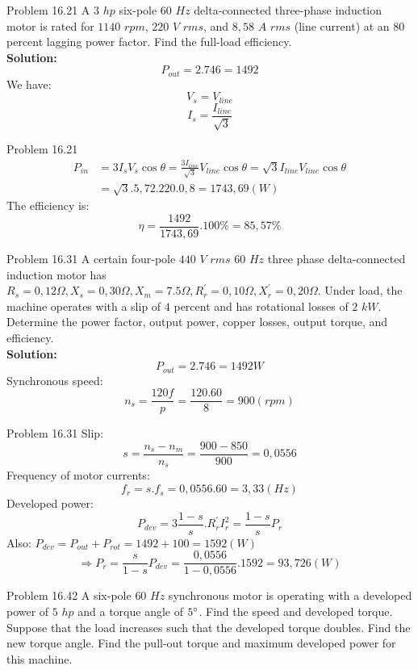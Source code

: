 \documentclass[11pt,aspectratio=169]{beamer}
\begin{document}
\begin{frame}{Problem 16.21}
    A $3$ $hp$ six-pole $60$ $Hz$ delta-connected 
    three-phase induction motor is rated for 
    $1140$ $rpm$, $220$ $V$ $rms$, and $8,58$ $A$ $rms$ (line 
    current) at an $80$ percent lagging power factor. Find the full-load efficiency.
    \\
    \textbf{Solution:}
    \\$$P_{out}=2.746=1492$$
    We have:
    $$V_{s}=V_{line}$$
    $$I_{s}=\frac{I_{line}}{\sqrt{3}}$$
\end{frame}
\begin{frame}{Problem 16.21}
    \begin{align*}
        P_{in}&=3I_{s}V_{s}\cos{\theta}=\frac{3I_{line}}{\sqrt{3}}V_{line}\cos{\theta}=\sqrt{3}I_{line}V_{line}\cos{\theta}\\&=\sqrt{3}.5,72.220.0,8=1743,69 (W)
        \end{align*}
        The efficiency is:
        $$\eta=\frac{1492}{1743,69}.100\%=85,57\%$$
\end{frame}
\begin{frame}{Problem 16.31}
    A certain four-pole $440$ $V$ $rms$ $60$ $Hz$ three
phase delta-connected induction motor has
 $R_{s} = 0,12\Omega, X_{s} = 0,30\Omega,X_{m} = 7.5\Omega,R_{r}^{'} = 0,10\Omega,
 X_{r}^{'}= 0,20 \Omega$.
 Under load, the machine operates with a 
slip of $4$ percent and has rotational losses of 
$2$ $kW$. Determine the power factor, output 
power, copper losses, output torque, and 
efficiency.
\\ \textbf{Solution:}
$$P_{out}=2.746=1492W$$
Synchronous speed:
$$n_{s}=\frac{120f}{p}=\frac{120.60}{8}=900(rpm)$$
\end{frame}
\begin{frame}{Problem 16.31}
    Slip:
    $$s=\frac{n_{s}-n_{m}}{n_{s}}=\frac{900-850}{900}=0,0556$$
    Frequency of motor currents:
    $$f_{r}=s.f_{s}=0,0556.60=3,33 (Hz)$$
    Developed power:
    $$P_{dev}=3\frac{1-s}{s}.R_{r}^{'}I_{r}^{2}=\frac{1-s}{s}P_{r}$$
    Also: $P_{dev}=P_{out}+P_{rot}=1492+100=1592 (W)$
    $$\Rightarrow P_{r}=\frac{s}{1-s}P_{dev}=\frac{0,0556}{1-0,0556}.1592=93,726(W)$$
\end{frame}
\begin{frame}{Problem 16.42}
    A six-pole $60$ $Hz$ synchronous motor is operating with a developed power of $5$ $hp$ and a torque angle of $5 \degree$. 
    Find the speed and developed torque. Suppose that the load increases such that the developed torque doubles.
    Find the new torque angle. Find the pull-out torque and maximum developed power for this machine.
\end{frame}
\end{document}
